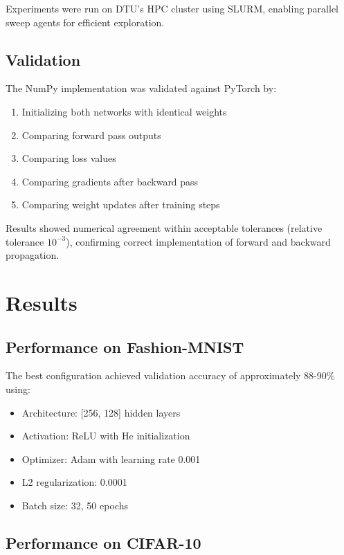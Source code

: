\documentclass[11pt,a4paper]{article}
\begin{document}
Experiments were run on DTU's HPC cluster using SLURM, enabling parallel sweep agents for efficient exploration.

\subsection{Validation}

The NumPy implementation was validated against PyTorch by:
\begin{enumerate}
\item Initializing both networks with identical weights
\item Comparing forward pass outputs
\item Comparing loss values
\item Comparing gradients after backward pass
\item Comparing weight updates after training steps
\end{enumerate}

Results showed numerical agreement within acceptable tolerances (relative tolerance $10^{-3}$), confirming correct implementation of forward and backward propagation.

\section{Results}

\subsection{Performance on Fashion-MNIST}

The best configuration achieved validation accuracy of approximately 88-90\% using:
\begin{itemize}
\item Architecture: [256, 128] hidden layers
\item Activation: ReLU with He initialization
\item Optimizer: Adam with learning rate 0.001
\item L2 regularization: 0.0001
\item Batch size: 32, 50 epochs
\end{itemize}

\subsection{Performance on CIFAR-10}
\end{document}
